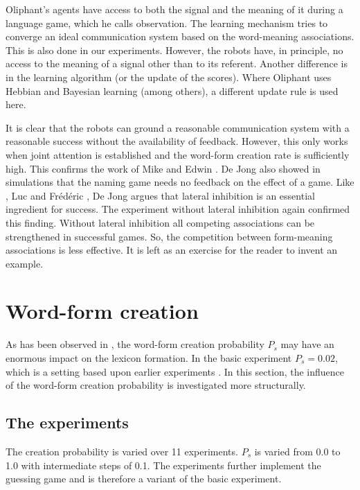 Oliphant's agents have access to both the signal and the meaning of it during a language game, which he calls observation. The learning mechanism tries to converge an ideal communication system based on the word-meaning associations. This is also done in our experiments. However, the robots have, in principle, no access to the meaning of a signal other than to its referent. Another difference is in the learning algorithm (or the update of the scores). Where Oliphant uses Hebbian and Bayesian learning (among others), a different update rule is used here.

It is clear that the robots can ground a reasonable communication system with a reasonable success without the availability of feedback. However, this only works when joint attention is established and the word-form creation rate is sufficiently high. This confirms the work of Mike \citet{oliphant:1997} and Edwin \citet{dejong:2000}. De Jong also showed in simulations that the naming game needs no feedback on the effect of a game. Like \citet{oliphant:1997}, Luc \citet{steels:2000} and Fr\'ed\'eric \citet{kaplan:2000}, De Jong argues that lateral inhibition is an essential ingredient for success. The experiment without lateral inhibition again confirmed this finding. Without lateral inhibition all competing associations can be strengthened in successful games. So, the competition between form-meaning associations is less effective. It is left as an exercise for the reader to invent an example.

\section{Word-form creation}\label{s:par:ps}

As has been observed in , the word-form creation probability $P_s$ may have an enormous impact on the lexicon formation. In the basic experiment $P_s=0.02$, which is a setting based upon earlier experiments \citep{vogt:1998b}. In this section, the influence of the word-form creation probability is investigated more structurally.

\subsection{The experiments}

The creation probability is varied over 11 experiments. $P_s$ is varied from 0.0 to 1.0 with intermediate steps of 0.1. The experiments further implement the guessing game and is therefore a variant of the basic experiment.


